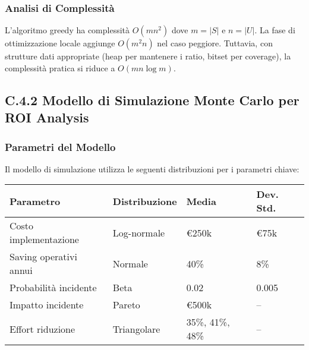 

\subsubsection{Analisi di Complessità}

L'algoritmo greedy ha complessità $O(mn^2)$ dove $m = |S|$ e $n = |U|$. La fase di ottimizzazione locale aggiunge $O(m^2n)$ nel caso peggiore. Tuttavia, con strutture dati appropriate (heap per mantenere i ratio, bitset per coverage), la complessità pratica si riduce a $O(mn \log m)$.

\subsection{\texorpdfstring{\textbf{C.4.2 Modello di Simulazione Monte Carlo per ROI Analysis}}{C.4.2 - Modello di Simulazione Monte Carlo per ROI Analysis}}

\subsubsection{Parametri del Modello}

Il modello di simulazione utilizza le seguenti distribuzioni per i parametri chiave:

\begin{table}[htbp]
\centering
\begin{tabular}{llll}
\toprule
\textbf{Parametro} & \textbf{Distribuzione} & \textbf{Media} & \textbf{Dev. Std.} \\
\midrule
Costo implementazione & Log-normale & €250k & €75k \\
Saving operativi annui & Normale & 40\% & 8\% \\
Probabilità incidente & Beta & 0.02 & 0.005 \\
Impatto incidente & Pareto & €500k & -- \\
Effort riduzione & Triangolare & 35\%, 41\%, 48\% & -- \\
\bottomrule
\end{tabular}
\end{table}

